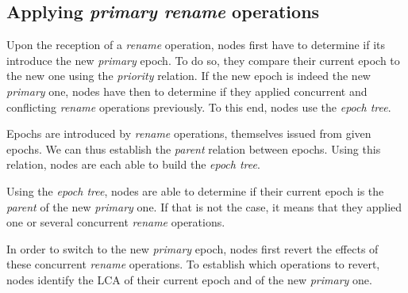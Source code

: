 \documentclass[sigplan,10pt]{acmart}
\begin{document}
\subsection{Applying \emph{primary rename} operations}


Upon the reception of a \emph{rename} operation, nodes first have to determine if its introduce the new \emph{primary} epoch.
To do so, they compare their current epoch to the new one using the \emph{priority} relation.
If the new epoch is indeed the new \emph{primary} one, nodes have then to determine if they applied concurrent and conflicting \emph{rename} operations previously.
To this end, nodes use the \emph{epoch tree}.

Epochs are introduced by \emph{rename} operations, themselves issued from given epochs.
We can thus establish the \emph{parent} relation between epochs.
Using this relation, nodes are each able to build the \emph{epoch tree}.

Using the \emph{epoch tree}, nodes are able to determine if their current epoch is the \emph{parent} of the new \emph{primary} one.
If that is not the case, it means that they applied one or several concurrent \emph{rename} operations.

In order to switch to the new \emph{primary} epoch, nodes first revert the effects of these concurrent \emph{rename} operations.
To establish which operations to revert, nodes identify the \ac{LCA} of their current epoch and of the new \emph{primary} one.
\end{document}

